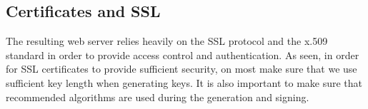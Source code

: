 \subsection {Certificates and SSL}

The resulting web server relies heavily on the SSL protocol and the x.509 standard in order to provide access control and authentication. As seen, in order for SSL certificates to provide sufficient security, on most make sure that we use sufficient key length when generating keys. It is also important to make sure that recommended algorithms are used during the generation and signing.  




